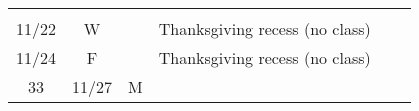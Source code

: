 \documentclass[]{article}
\begin{document}
\begin{longtable}[]{@{}ccclll@{}}
\begin{minipage}[t]{0.12\columnwidth}
\strut
\end{minipage}\tabularnewline
\begin{minipage}[t]{0.13\columnwidth}\centering\strut
11/22\strut
\end{minipage} & \begin{minipage}[t]{0.08\columnwidth}\centering\strut
W\strut
\end{minipage} & \begin{minipage}[t]{0.07\columnwidth}\centering\strut
\strut
\end{minipage} & \begin{minipage}[t]{0.10\columnwidth}\raggedright\strut
Thanksgiving recess (no class)\strut
\end{minipage} & \begin{minipage}[t]{0.12\columnwidth}\raggedright\strut
\strut
\end{minipage} & \begin{minipage}[t]{0.12\columnwidth}\raggedright\strut
\strut
\end{minipage}\tabularnewline
\begin{minipage}[t]{0.13\columnwidth}\centering\strut
11/24\strut
\end{minipage} & \begin{minipage}[t]{0.08\columnwidth}\centering\strut
F\strut
\end{minipage} & \begin{minipage}[t]{0.07\columnwidth}\centering\strut
\strut
\end{minipage} & \begin{minipage}[t]{0.10\columnwidth}\raggedright\strut
Thanksgiving recess (no class)\strut
\end{minipage} & \begin{minipage}[t]{0.12\columnwidth}\raggedright\strut
\strut
\end{minipage} & \begin{minipage}[t]{0.12\columnwidth}\raggedright\strut
\strut
\end{minipage}\tabularnewline
\begin{minipage}[t]{0.13\columnwidth}\centering\strut
33\strut
\end{minipage} & \begin{minipage}[t]{0.08\columnwidth}\centering\strut
11/27\strut
\end{minipage} & \begin{minipage}[t]{0.07\columnwidth}\centering\strut
M\strut
\end{minipage} & \begin{minipage}[t]{0.10\columnwidth}\raggedright\strut

\end{minipage}
\end{longtable}
\end{document}
